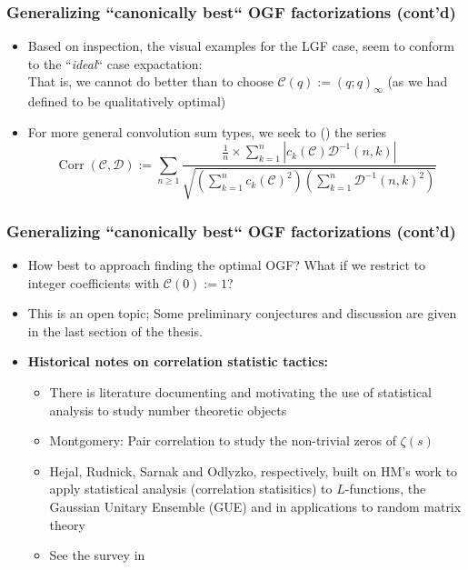 \begin{frame}
\frametitle{Generalizing ``canonically best`` OGF factorizations (cont'd)}
\begin{itemize} 

\item Based on inspection, the visual  examples for the LGF case, seem to conform to the 
      ``\emph{ideal}`` case expactation: \\ 
      That is, we cannot do better than to choose 
      $\mathcal{C}(q) := (q; q)_{\infty}$ (as we had defined to be qualitatively optimal)
\pause\item For more general convolution sum types, we seek to  () the 
      series 
      \[
      \operatorname{Corr}(\mathcal{C}, \mathcal{D}) := 
           \sum_{n \geq 1} \frac{\frac{1}{n} \times \sum\limits_{k=1}^{n} |c_k(\mathcal{C}) \mathcal{D}^{-1}(n, k)|}{ 
           \sqrt{\left(\sum\limits_{k=1}^{n} c_k(\mathcal{C})^2\right) \left( 
           \sum\limits_{k=1}^{n} \mathcal{D}^{-1}(n, k)^2\right)}}
      \]

\end{itemize}

\end{frame}

\begin{frame}
\frametitle{Generalizing ``canonically best`` OGF factorizations (cont'd)}

\small
\begin{itemize} 

\item How best to approach finding the optimal OGF? 
      What if we restrict to integer coefficients with $\mathcal{C}(0) := 1$? 
\pause\item This is an open topic; Some preliminary conjectures and discussion are given in the last 
      section of the thesis. 
\pause\item {\small \textbf{Historical notes on correlation statistic tactics:}} 
      \begin{itemize}
      \item There is literature documenting and motivating the use of statistical analysis to 
	    study number theoretic objects  
      \pause\item Montgomery: Pair correlation to study the non-trivial zeros of $\zeta(s)$
      \pause\item Hejal, Rudnick, Sarnak and Odlyzko, respectively, built on HM's work to apply 
	             statistical analysis (correlation statisitics) to $L$-functions, the 
                  Gaussian Unitary Ensemble (GUE) and in applications to random matrix theory 
      \pause\item See the survey in \cite{WILLIAMS-MILLER-PCORR-OVERVIEW-REF}
      \end{itemize}

\end{itemize}

\end{frame}

